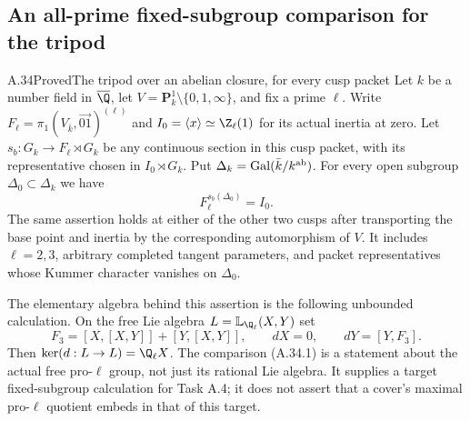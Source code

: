 \subsection{An all-prime fixed-subgroup comparison for the tripod}

\begin{statement}{A.34}{Proved}{The tripod over an abelian closure, for every cusp packet}
Let $k$ be a number field in $\overline{\Q}$, let
$V=\mathbf P^1_k\setminus\{0,1,\infty\}$, and fix a prime $\ell$.
Write $F_\ell=\pi_1(V_{\bar k},\overrightarrow{01})^{(\ell)}$
and $I_0=\langle x\rangle\simeq\Z_\ell(1)$ for its actual inertia
at zero. Let $s_b:G_k\longrightarrow F_\ell\rtimes G_k$ be any
continuous section in this cusp packet, with its representative
chosen in $I_0\rtimes G_k$. Put
$\Delta_k=\operatorname{Gal}(\bar k/k^{\rm ab})$.
For every open subgroup $\Delta_0\subset\Delta_k$ we have
\[
                   F_\ell^{s_b(\Delta_0)}=I_0.        \tag{A.34.1}
\]
The same assertion holds at either of the other two cusps after
transporting the base point and inertia by the corresponding
automorphism of $V$. It includes $\ell=2,3$, arbitrary completed
tangent parameters, and packet representatives whose Kummer
character vanishes on $\Delta_0$.

The elementary algebra behind this assertion is the following
unbounded calculation. On the free Lie algebra
$L=\mathbb L_{\Q_\ell}(X,Y)$ set
\[
 F_3=[X,[X,Y]]+[Y,[X,Y]],\qquad
 dX=0,\qquad dY=[Y,F_3].                               \tag{A.34.2}
\]
Then $\ker(d:L\to L)=\Q_\ell X$.
The comparison (A.34.1) is a statement about the actual free
pro-$\ell$ group, not just its rational Lie algebra. It supplies
a target fixed-subgroup calculation for Task A.4; it does not
assert that a cover's maximal pro-$\ell$ quotient embeds in
that of this target.
\end{statement}
